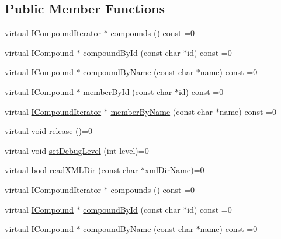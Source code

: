 \subsection*{Public Member Functions}
\begin{DoxyCompactItemize}
\item 
virtual \mbox{\hyperlink{class_i_compound_iterator}{I\+Compound\+Iterator}} $\ast$ \mbox{\hyperlink{class_i_doxygen_acdee4e3efe347f2d97363fdf80609e6e}{compounds}} () const =0
\item 
virtual \mbox{\hyperlink{class_i_compound}{I\+Compound}} $\ast$ \mbox{\hyperlink{class_i_doxygen_aec9e0df2a3c6a8085358ff0f07c52c55}{compound\+By\+Id}} (const char $\ast$id) const =0
\item 
virtual \mbox{\hyperlink{class_i_compound}{I\+Compound}} $\ast$ \mbox{\hyperlink{class_i_doxygen_a8da2fb55aad2aa941b2c529a5f1361aa}{compound\+By\+Name}} (const char $\ast$name) const =0
\item 
virtual \mbox{\hyperlink{class_i_compound}{I\+Compound}} $\ast$ \mbox{\hyperlink{class_i_doxygen_ac7544d8d1dd53c3a8d1e180d81bca0e9}{member\+By\+Id}} (const char $\ast$id) const =0
\item 
virtual \mbox{\hyperlink{class_i_compound_iterator}{I\+Compound\+Iterator}} $\ast$ \mbox{\hyperlink{class_i_doxygen_a1895a0347469d6e4788da0beca0e071c}{member\+By\+Name}} (const char $\ast$name) const =0
\item 
virtual void \mbox{\hyperlink{class_i_doxygen_a6865961012ad8e6c19b7575488046045}{release}} ()=0
\item 
virtual void \mbox{\hyperlink{class_i_doxygen_ae8e3759ffc6d64684dc500855f6fead6}{set\+Debug\+Level}} (int level)=0
\item 
virtual bool \mbox{\hyperlink{class_i_doxygen_a7959d93fba77caddee37b6d8370c10f0}{read\+X\+M\+L\+Dir}} (const char $\ast$xml\+Dir\+Name)=0
\item 
virtual \mbox{\hyperlink{class_i_compound_iterator}{I\+Compound\+Iterator}} $\ast$ \mbox{\hyperlink{class_i_doxygen_acdee4e3efe347f2d97363fdf80609e6e}{compounds}} () const =0
\item 
virtual \mbox{\hyperlink{class_i_compound}{I\+Compound}} $\ast$ \mbox{\hyperlink{class_i_doxygen_aec9e0df2a3c6a8085358ff0f07c52c55}{compound\+By\+Id}} (const char $\ast$id) const =0
\item 
virtual \mbox{\hyperlink{class_i_compound}{I\+Compound}} $\ast$ \mbox{\hyperlink{class_i_doxygen_a8da2fb55aad2aa941b2c529a5f1361aa}{compound\+By\+Name}} (const char $\ast$name) const =0

\end{DoxyCompactItemize}
